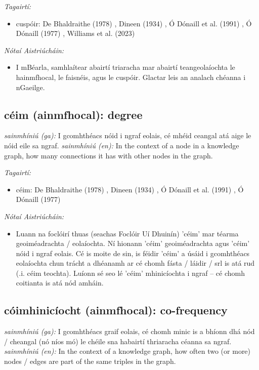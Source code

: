 \documentclass{article}
\begin{document}
 \noindent \textit{Tagairtí:}
\begin{itemize}
	\item cuspóir: De Bhaldraithe (1978) \cite{de-bhaldraithe}, Dineen (1934) \cite{dineen}, Ó Dónaill et al. (1991) \cite{focloir-beag}, Ó Dónaill (1977) \cite{odonaill}, Williams et al. (2023) \cite{storchiste}
\end{itemize}

 \noindent \textit{Nótaí Aistriúcháin:}
\begin{itemize}
	\item I mBéarla, samhlaítear abairtí triaracha mar abairtí teangeolaíochta le hainmfhocal, le faisnéis, agus le cuspóir. Glactar leis an analach chéanna i nGaeilge.
\end{itemize}


\subsection*{céim (ainmfhocal): degree} 
 \noindent \textit{sainmhíniú (ga):} I gcomhthéacs nóid i ngraf eolais, cé mhéid ceangal atá aige le nóid eile sa ngraf.
\newline\newline
 \noindent \textit{sainmhíniú (en):} In the context of a node in a knowledge graph, how many connections it has with other nodes in the graph.
\newline

 \noindent \textit{Tagairtí:}
\begin{itemize}
	\item céim: De Bhaldraithe (1978) \cite{de-bhaldraithe}, Dineen (1934) \cite{dineen}, Ó Dónaill et al. (1991) \cite{focloir-beag}, Ó Dónaill (1977) \cite{odonaill}
\end{itemize}

 \noindent \textit{Nótaí Aistriúcháin:}
\begin{itemize}
	\item Luann na foclóirí thuas (seachas Foclóir Uí Dhuinín) 'céim' mar téarma geoiméadrachta / eolaíochta. Ní hionann 'céim' geoiméadrachta agus 'céim' nóid i ngraf eolais. Cé is moite de sin, is féidir 'céim' a úsáid i gcomhthéacs eolaíochta chun trácht a dhéanamh ar cé chomh fásta / láidir / srl is atá rud (.i. céim teochta). Luíonn sé seo lé 'céim' mhinicíochta i ngraf -- cé chomh coitianta is atá nód amháin.
\end{itemize}


\subsection*{cóimhinicíocht (ainmfhocal): co-frequency} 
 \noindent \textit{sainmhíniú (ga):} I gcomhthéacs graif eolais, cé chomh minic is a bhíonn dhá nód / cheangal (nó níos mó) le chéile sna habairtí thriaracha céanna sa ngraf.
\newline\newline
 \noindent \textit{sainmhíniú (en):} In the context of a knowledge graph, how often two (or more) nodes / edges are part of the same triples in the graph.
\newline
\end{document}
